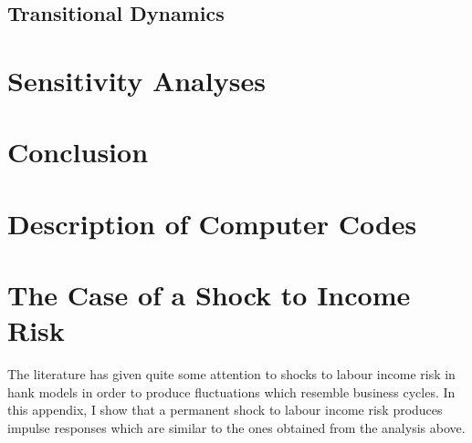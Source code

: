 \documentclass[12pt]{article}
\numberwithin{equation}{section} %
\begin{document}
\subsection{Transitional Dynamics}
\label{sec:results-transition}

\section{Sensitivity Analyses}
\label{sec:sensitivity}

\section{Conclusion}
\label{sec:conclusion}

\newpage
\thispagestyle{plain}
\printbibliography[heading=bibintoc] %

\newpage
\thispagestyle{plain}
\renewcommand*{\thepage}{A-\arabic{page}}
\begin{appendices}
\section{Description of Computer Codes}
\label{sec-app:codes}

\newpage
\thispagestyle{plain}
\section{The Case of a Shock to Income Risk}
\label{sec-app:income}
The literature has given quite some attention to shocks to labour income risk in \Gls{hank} models in order to produce fluctuations which resemble business cycles. In this appendix, I show that a permanent shock to labour income risk produces impulse responses which are similar to the ones obtained from the analysis above.

\end{appendices}

\newpage
\thispagestyle{plain}
\end{document}
